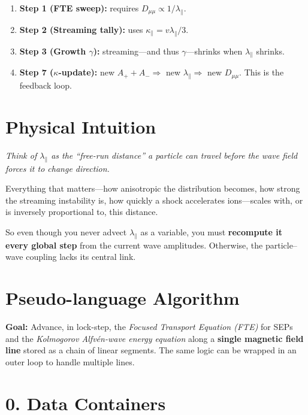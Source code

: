 \begin{enumerate}
    \item \textbf{Step 1 (FTE sweep):} requires $D_{\mu\mu} \propto 1/\lambda_{\parallel}$.
    \item \textbf{Step 2 (Streaming tally):} uses $\kappa_{\parallel} = v \lambda_{\parallel} / 3$.
    \item \textbf{Step 3 (Growth $\gamma$):} streaming—and thus $\gamma$—shrinks when $\lambda_{\parallel}$ shrinks.
    \item \textbf{Step 7 ($\kappa$-update):} new $A_+ + A_- \Rightarrow$ new $\lambda_{\parallel} \Rightarrow$ new $D_{\mu\mu}$. This is the feedback loop.
\end{enumerate}

\section*{Physical Intuition}

\emph{Think of $\lambda_{\parallel}$ as the “free-run distance” a particle can travel before the wave field forces it to change direction.}

\medskip

Everything that matters—how anisotropic the distribution becomes, how strong the streaming instability is, how quickly a shock accelerates ions—scales with, or is inversely proportional to, this distance.

\medskip

So even though you never advect $\lambda_{\parallel}$ as a variable, you must \textbf{recompute it every global step} from the current wave amplitudes. Otherwise, the particle–wave coupling lacks its central link.


\section*{Pseudo-language Algorithm}

\textbf{Goal:} Advance, in lock-step, the \emph{Focused Transport Equation (FTE)} for SEPs and the \emph{Kolmogorov Alfvén-wave energy equation} along a \textbf{single magnetic field line} stored as a chain of linear segments.  
The same logic can be wrapped in an outer loop to handle multiple lines.

\section*{0. Data Containers}


